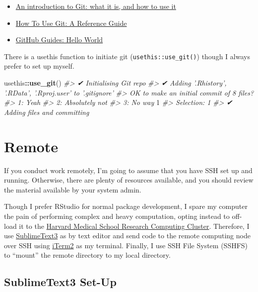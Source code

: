 \documentclass[]{book}
\newenvironment{Shaded}{\begin{snugshade}}{\end{snugshade}}
\newcommand{\KeywordTok}[1]{\textcolor[rgb]{0.13,0.29,0.53}{\textbf{#1}}}
\newcommand{\DecValTok}[1]{\textcolor[rgb]{0.00,0.00,0.81}{#1}}
\newcommand{\CommentTok}[1]{\textcolor[rgb]{0.56,0.35,0.01}{\textit{#1}}}
\newcommand{\OperatorTok}[1]{\textcolor[rgb]{0.81,0.36,0.00}{\textbf{#1}}}
\newcommand{\NormalTok}[1]{#1}
\providecommand{\tightlist}{%
  \setlength{\itemsep}{0pt}\setlength{\parskip}{0pt}}
\begin{document}
\begin{itemize}
\tightlist
\item
  \href{https://medium.freecodecamp.org/what-is-git-and-how-to-use-it-c341b049ae61}{An
  introduction to Git: what it is, and how to use it}
\item
  \href{https://www.digitalocean.com/community/tutorials/how-to-use-git-a-reference-guide}{How
  To Use Git: A Reference Guide}
\item
  \href{https://guides.github.com/activities/hello-world/}{GitHub
  Guides: Hello World}
\end{itemize}

There is a usethis function to initiate git
(\texttt{usethis::use\_git()}) though I always prefer to set up myself.

\begin{Shaded}
\begin{Highlighting}[]
\NormalTok{usethis}\OperatorTok{::}\KeywordTok{use_git}\NormalTok{()}
\CommentTok{#> ✔ Initialising Git repo}
\CommentTok{#> ✔ Adding '.Rhistory', '.RData', '.Rproj.user' to '.gitignore'}
\CommentTok{#> OK to make an initial commit of 8 files?}
\CommentTok{#> 1: Yeah}
\CommentTok{#> 2: Absolutely not}
\CommentTok{#> 3: No way}
\DecValTok{1}
\CommentTok{#> Selection: 1}
\CommentTok{#> ✔ Adding files and committing}
\end{Highlighting}
\end{Shaded}

\section{Remote}\label{remote}

If you conduct work remotely, I'm going to assume that you have SSH set
up and running. Otherwise, there are plenty of resources available, and
you should review the material available by your system admin.

Though I prefer RStudio for normal package development, I spare my
computer the pain of performing complex and heavy computation, opting
instead to off-load it to the \href{https://rc.hms.harvard.edu}{Harvard
Medical School Research Computing Cluster}. Therefore, I use
\href{https://www.sublimetext.com}{SublimeText3} as by text editor and
send code to the remote computing node over SSH using
\href{https://iterm2colorschemes.com}{iTerm2} as my terminal. Finally, I
use SSH File System (SSHFS) to ``mount'' the remote directory to my
local directory.

\subsection{SublimeText3 Set-Up}\label{sublimetext3-set-up}
\end{document}
